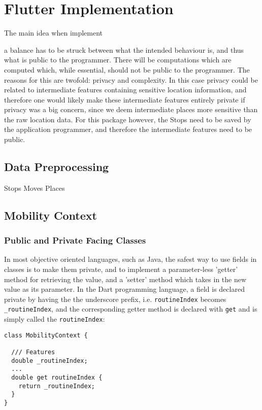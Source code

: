 \section{Flutter Implementation}
The main idea when implement

a balance has to be struck between what the intended behaviour is, and thus what is public to the programmer. There will be computations which are computed which, while essential, should not be public to the programmer. The reasons for this are twofold: privacy and complexity. In this case privacy could be related to intermediate features containing sensitive location information, and therefore one would likely make these intermediate features entirely private if privacy was a big concern, since we deem intermediate places more sensitive than the raw location data. For this package however, the Stops need to be saved by the application programmer, and therefore the intermediate features need to be public. 



\subsection{Data Preprocessing}
Stops Moves Places

\subsection{Mobility Context}
\subsubsection{Public and Private Facing Classes}
In most objective oriented languages, such as Java, the safest way to use fields in classes is to make them private, and to implement a parameter-less 'getter' method for retrieving the value, and a 'setter' method which takes in the new value as its parameter. In the Dart programming language, a field is declared private by having the the underscore prefix, i.e. \verb|routineIndex| becomes \verb|_routineIndex|, and the corresponding getter method is declared with \verb|get| and is simply called the \verb|routineIndex|:

\begin{verbatim}
class MobilityContext {

  /// Features
  double _routineIndex;
  ...
  double get routineIndex {
    return _routineIndex;
  }
}
\end{verbatim}

